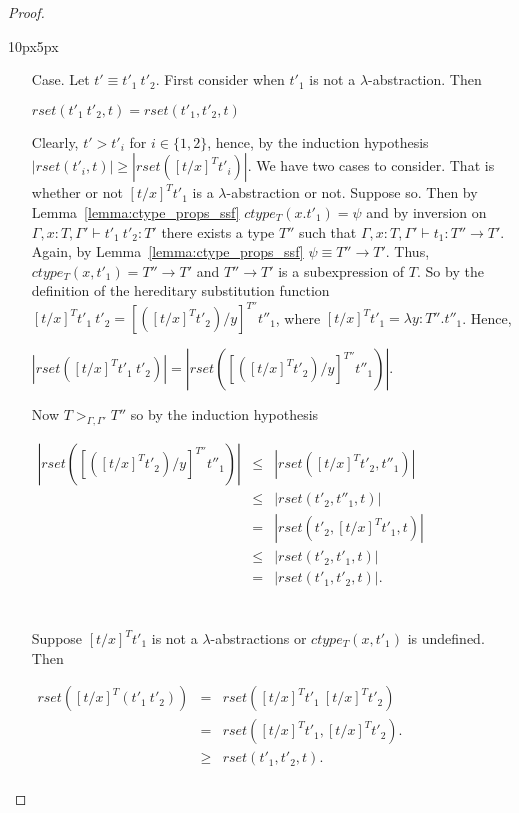 \begin{proof}
\begin{changemargin}{10px}{5px}
\begin{itemize}
\item[Case.] Let $t' \equiv t'_1\ t'_2$.  First consider when $t'_1$ is not a $\lambda$-abstraction. Then
  \begin{center}
    $rset(t'_1\ t'_2, t) = rset(t'_1, t'_2, t)$
  \end{center}  
  Clearly,  $t' > t'_i$ for $i \in \{1,2\}$, hence, by the induction hypothesis $|rset(t'_i,t)| \geq |rset([t/x]^T t'_i)|$.  
  We have two cases to consider.  That is whether or not $[t/x]^T t'_1$ is a $\lambda$-abstraction or not.  Suppose so.
  Then by Lemma~\ref{lemma:ctype_props_ssf} $ctype_T(x.t'_1) = \psi$ and by inversion on $\Gamma,x:T,\Gamma' \vdash t'_1\ t'_2:T'$
  there exists a type $T''$ such that $\Gamma,x:T,\Gamma' \vdash t_1:T'' \to T'$.  Again, by Lemma~\ref{lemma:ctype_props_ssf}
  $\psi \equiv T'' \to T'$. Thus, $ctype_T(x,t'_1) = T'' \to T'$ and $T'' \to T'$ is a subexpression of $T$.
  So by the definition of the hereditary substitution function $[t/x]^T t'_1\ t'_2 = [([t/x]^T t'_2)/y]^{T''} t''_1$, where
  $[t/x]^T t'_1 = \lambda y:T''.t''_1$.  Hence,
  \begin{center}
    \begin{math}
      |rset([t/x]^T t'_1\ t'_2)| = |rset([([t/x]^T t'_2)/y]^{T''} t''_1)|.
    \end{math}
  \end{center}
  Now $T >_{\Gamma,\Gamma'} T''$ so by the induction hypothesis 
  \begin{center}
    \begin{math}
      \begin{array}{lll}
        |rset([([t/x]^T t'_2)/y]^{T''} t''_1)| & \leq & |rset([t/x]^T t'_2, t''_1)|\\
        & \leq & |rset(t'_2, t''_1, t)|\\
        & = & |rset(t'_2, [t/x]^T t'_1, t)|\\
        & \leq & |rset(t'_2, t'_1, t)|\\
        & = & |rset(t'_1, t'_2, t)|.\\
      \end{array}
    \end{math}
  \end{center}
  
  \ \\
  \noindent
  Suppose $[t/x]^T t'_1$ is not a $\lambda$-abstractions or
  $ctype_T(x,t'_1)$ is undefined.  \\
  Then
  \begin{center}
    \begin{math}
      \begin{array}{lll}
        rset([t/x]^T (t'_1\ t'_2)) & = & rset([t/x]^T t'_1\ [t/x]^T t'_2)\\
        & = & rset([t/x]^T t'_1, [t/x]^T t'_2).\\
        & \geq & rset(t'_1, t'_2, t).\\
      \end{array}
    \end{math}
  \end{center}
  

\end{itemize}
\end{changemargin}
\end{proof}
